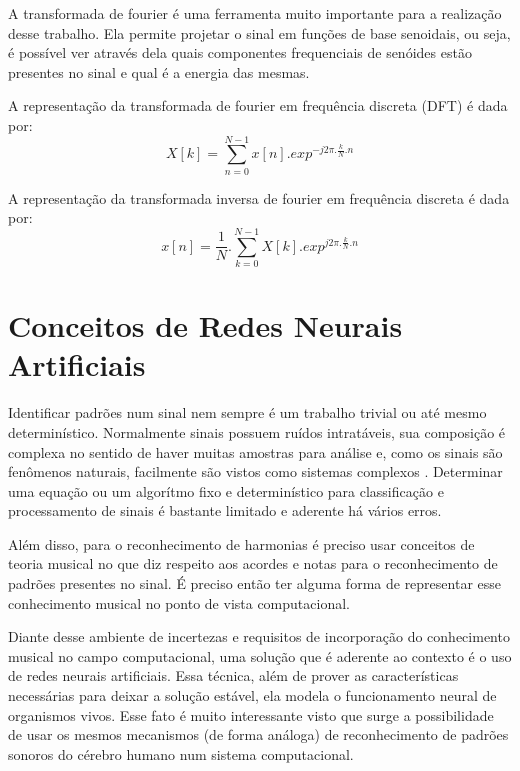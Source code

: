 A transformada de fourier é uma ferramenta muito importante para a realização desse trabalho. Ela permite projetar o sinal em funções de base senoidais, ou seja, é possível ver através dela quais componentes frequenciais de senóides estão presentes no sinal e qual é a energia das mesmas.

A representação da transformada de fourier em frequência discreta (DFT) é dada por:
\begin{equation}
\label{eqn12}
	X[k] = \sum_{n=0}^{N - 1}{x[n].{exp}^{-j2\pi.\frac{k}{N}.n}}
\end{equation}

A representação da transformada inversa de fourier em frequência discreta é dada por:
\begin{equation}
\label{eqn13}
	x[n] = \frac{1}{N}.\sum_{k=0}^{N - 1}{X[k].{exp}^{j2\pi.\frac{k}{N}.n}}
\end{equation}


\section{Conceitos de Redes Neurais Artificiais}
\label{sec:conceitosredesneurais}

Identificar padrões num sinal nem sempre é um trabalho trivial ou até mesmo determinístico. Normalmente sinais possuem ruídos intratáveis, sua composição é complexa no sentido de haver muitas amostras para análise e, como os sinais são fenômenos naturais, facilmente são vistos como sistemas complexos \cite{morin}. Determinar uma equação ou um algorítmo fixo e determinístico para classificação e processamento de sinais é bastante limitado e aderente há vários erros.

Além disso, para o reconhecimento de harmonias é preciso usar conceitos de teoria musical no que diz respeito aos acordes e notas para o reconhecimento de padrões presentes no sinal. É preciso então ter alguma forma de representar esse conhecimento musical no ponto de vista computacional.

Diante desse ambiente de incertezas e requisitos de incorporação do conhecimento musical no campo computacional, uma solução que é aderente ao contexto é o uso de redes neurais artificiais. Essa técnica, além de prover as características necessárias para deixar a solução estável, ela modela o funcionamento neural de organismos vivos. Esse fato é muito interessante visto que surge a possibilidade de usar os mesmos mecanismos (de forma análoga) de reconhecimento de padrões sonoros do cérebro humano num sistema computacional.

